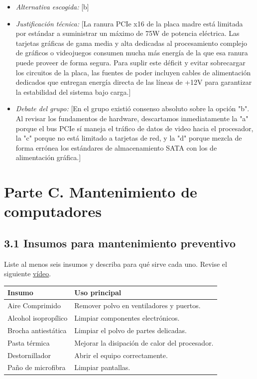 \documentclass{article}
\begin{document}
\begin{itemize}
\item \emph{Alternativa escogida:} [b]

\item \emph{Justificación técnica:} [La ranura PCIe x16 de la placa madre está
limitada por estándar a suministrar un máximo de 75W de potencia
eléctrica. Las tarjetas gráficas de gama media y alta dedicadas al
procesamiento complejo de gráficos o videojuegos consumen mucha más
energía de la que esa ranura puede proveer de forma segura. Para
suplir este déficit y evitar sobrecargar los circuitos de la placa,
las fuentes de poder incluyen cables de alimentación dedicados que
entregan energía directa de las líneas de +12V para garantizar la
estabilidad del sistema bajo carga.]

\item \emph{Debate del grupo:} [En el grupo existió consenso absoluto sobre la
opción "b". Al revisar los fundamentos de hardware, descartamos
inmediatamente la "a" porque el bus PCIe sí maneja el tráfico de
datos de video hacia el procesador, la "c" porque no está limitado a
tarjetas de red, y la "d" porque mezcla de forma errónea los
estándares de almacenamiento SATA con los de alimentación gráfica.]
\end{itemize}

\section{Parte C. Mantenimiento de computadores}
\label{sec:org4f7ae37}

\subsection{3.1 Insumos para mantenimiento preventivo}
\label{sec:orgee55e7a}
Liste al menos seis insumos y describa para qué sirve cada
uno. Revise el siguiente \href{https://youtu.be/3ri1BMV7XTM?si=bjYoDUUKuMWwj4Qg}{vídeo}.

\begin{center}
\begin{tabular}{ll}
Insumo & Uso principal\\[0pt]
\hline
Aire Comprimido & Remover polvo en ventiladores y puertos.\\[0pt]
Alcohol isopropílico & Limpiar componentes electrónicos.\\[0pt]
Brocha antiestática & Limpiar el polvo de partes delicadas.\\[0pt]
Pasta térmica & Mejorar la disipación de calor del procesador.\\[0pt]
Destornillador & Abrir el equipo correctamente.\\[0pt]
Paño de microfibra & Limpiar pantallas.\\[0pt]
\end{tabular}
\end{center}
\end{document}
